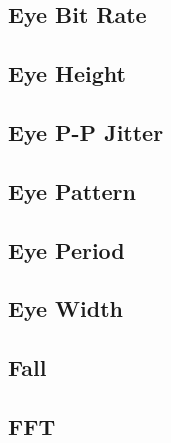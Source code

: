 \subsection{Eye Bit Rate}

\pagebreak
\subsection{Eye Height}

\pagebreak
\subsection{Eye P-P Jitter}

\pagebreak
\subsection{Eye Pattern}

\pagebreak
\subsection{Eye Period}

\pagebreak
\subsection{Eye Width}

\pagebreak
\subsection{Fall}

\pagebreak
\subsection{FFT}

